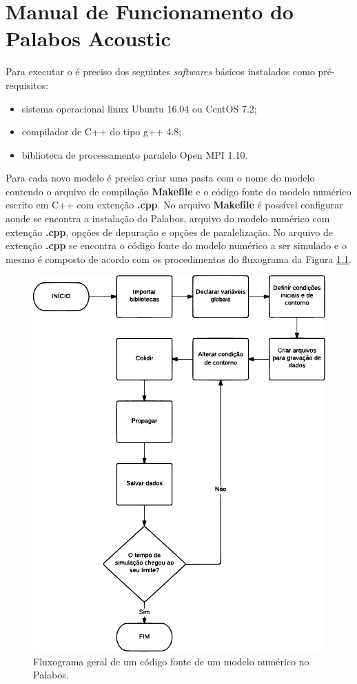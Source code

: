 \chapter{Manual de Funcionamento do Palabos Acoustic}

Para executar o  é preciso dos seguintes \textit{softwares} básicos instalados como pré-requisitos:

\begin{itemize}
  \item sistema operacional linux Ubuntu 16.04 ou CentOS 7.2;
  \item compilador de C++ do tipo g++ 4.8;
  \item biblioteca de processamento paralelo Open MPI 1.10. 
\end{itemize}

Para cada novo modelo é preciso criar uma pasta com o nome do modelo contendo o arquivo de compilação \textbf{Makefile} e o código fonte do modelo numérico escrito em C++ com extenção \textbf{.cpp}. No arquivo \textbf{Makefile} é possível configurar aonde se encontra a instalação do Palabos, arquivo do modelo numérico com extenção \textbf{.cpp}, opções de depuração e opções de paralelização. No arquivo de extenção \textbf{.cpp} se encontra o código fonte do modelo numérico a ser simulado e o mesmo é composto de acordo com os procedimentos do fluxograma da Figura \ref{fig:palabos_fluxo}.


\begin{figure}[ht!]
\centering
  \includegraphics[width=.8\linewidth]{figuras/palabos_modelo_fluxo.pdf}
  \caption[Fluxograma de um modelo numérico no Palabos]{Fluxograma geral de um código fonte de um modelo numérico no Palabos.}
  \label{fig:palabos_fluxo}
\end{figure}

